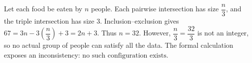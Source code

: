 Let each food be eaten by $n$ people. Each pairwise intersection has size $\dfrac{n}{3}$, and the triple intersection has size $3$. Inclusion--exclusion gives $67=3n-3(\dfrac{n}{3})+3=2n+3$. Thus $\boxed{n=32}$. However, $\dfrac{n}{3}=\dfrac{32}{3}$ is not an integer, so no actual group of people can satisfy all the data. The formal calculation exposes an inconsistency: $\boxed{\text{no such configuration exists}}$.
